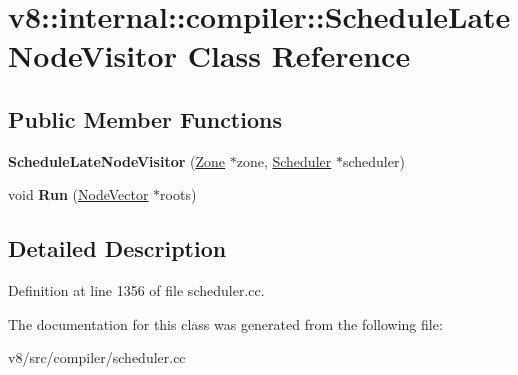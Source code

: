 \hypertarget{classv8_1_1internal_1_1compiler_1_1ScheduleLateNodeVisitor}{}\section{v8\+:\+:internal\+:\+:compiler\+:\+:Schedule\+Late\+Node\+Visitor Class Reference}
\label{classv8_1_1internal_1_1compiler_1_1ScheduleLateNodeVisitor}
\subsection*{Public Member Functions}
\begin{DoxyCompactItemize}
\item 
\mbox{\label{classv8_1_1internal_1_1compiler_1_1ScheduleLateNodeVisitor_a152de8d44321988026d0e261d1421ffa}} 
{\bfseries Schedule\+Late\+Node\+Visitor} (\mbox{\hyperlink{classv8_1_1internal_1_1Zone}{Zone}} $\ast$zone, \mbox{\hyperlink{classv8_1_1internal_1_1compiler_1_1Scheduler}{Scheduler}} $\ast$scheduler)
\item 
\mbox{\label{classv8_1_1internal_1_1compiler_1_1ScheduleLateNodeVisitor_a315e9a9843cfe9dc2bc80b407041b51e}} 
void {\bfseries Run} (\mbox{\hyperlink{classv8_1_1internal_1_1ZoneVector}{Node\+Vector}} $\ast$roots)
\end{DoxyCompactItemize}


\subsection{Detailed Description}


Definition at line 1356 of file scheduler.\+cc.



The documentation for this class was generated from the following file\+:\begin{DoxyCompactItemize}
\item 
v8/src/compiler/scheduler.\+cc\end{DoxyCompactItemize}
